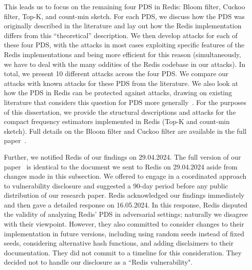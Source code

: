 This leads us to focus on the remaining four PDS in Redis: Bloom filter, Cuckoo filter, Top-K, and count-min sketch. For each  PDS, we discuss how the PDS was originally described in the literature and lay out how the Redis implementation differs from this ``theoretical'' description. We then develop attacks for each of these four PDS, with the attacks in most cases exploiting specific features of the Redis implementations and being more efficient for this reason (simultaneously, we have to deal with the many oddities of the Redis codebase in our attacks). In total, we present 10 different attacks across the four PDS. We compare our attacks with  known attacks for these PDS from the literature. We also look at how the PDS in Redis can be protected against attacks, drawing on existing literature that considers this question for PDS more generally~\cite{clayton2019,FPUV22,PatersonR22,markelon23}. For the purposes of this dissertation, we provide the structural descriptions and attacks for the compact frequency estimators implemented in Redis (Top-K and count-min sketch). Full details on the Bloom filter and Cuckoo filter are available in the full paper~\cite{cryptoeprint:2024/1312}.

Further, we notified Redis of our findings on 29.04.2024. The full version of our paper~\cite{cryptoeprint:2024/1312} is identical to the document we sent to Redis on 29.04.2024 aside from changes made in this subsection. We offered to engage in a coordinated approach to vulnerability disclosure and suggested a 90-day period before any public distribution of our research paper. Redis acknowledged our findings immediately and then gave a detailed response on 16.05.2024. In this response, Redis disputed the validity of analyzing Redis' PDS in adversarial settings; naturally we disagree with their viewpoint. However, they also committed to consider changes to their implementation in future versions, including using random seeds instead of fixed seeds, considering alternative hash functions, and adding disclaimers to their documentation. They did not commit to a timeline for this consideration. They decided not to handle our disclosure as a ``Redis vulnerability".
